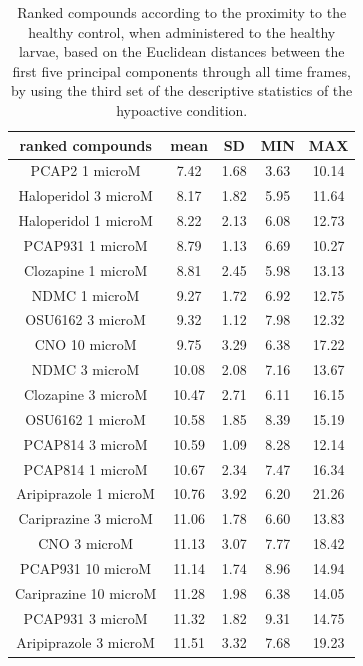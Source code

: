 \begin{table}[h!]\tiny
\centering
\caption{Ranked compounds according to the proximity to the healthy control, when administered to the healthy larvae, based on the Euclidean distances between the first five principal components through all time frames, by using the third set of the descriptive statistics of the hypoactive condition.}
\begin{tabular}{|c|c|c|c|c|}
\hline
ranked compounds             & mean & SD   & MIN  & MAX   \\ \hline
PCAP2 1 microM         & 7.42  & 1.68 & 3.63  & 10.14 \\ \hline
Haloperidol 3 microM   & 8.17  & 1.82 & 5.95  & 11.64 \\ \hline
Haloperidol 1 microM   & 8.22  & 2.13 & 6.08  & 12.73 \\ \hline
PCAP931 1 microM       & 8.79  & 1.13 & 6.69  & 10.27 \\ \hline
Clozapine 1 microM     & 8.81  & 2.45 & 5.98  & 13.13 \\ \hline
NDMC 1 microM          & 9.27  & 1.72 & 6.92  & 12.75 \\ \hline
OSU6162 3 microM       & 9.32  & 1.12 & 7.98  & 12.32 \\ \hline
CNO 10 microM          & 9.75  & 3.29 & 6.38  & 17.22 \\ \hline
NDMC 3 microM          & 10.08 & 2.08 & 7.16  & 13.67 \\ \hline
Clozapine 3 microM     & 10.47 & 2.71 & 6.11  & 16.15 \\ \hline
OSU6162 1 microM       & 10.58 & 1.85 & 8.39  & 15.19 \\ \hline
PCAP814 3 microM       & 10.59 & 1.09 & 8.28  & 12.14 \\ \hline
PCAP814 1 microM       & 10.67 & 2.34 & 7.47  & 16.34 \\ \hline
Aripiprazole 1 microM  & 10.76 & 3.92 & 6.20   & 21.26 \\ \hline
Cariprazine 3 microM   & 11.06 & 1.78 & 6.60   & 13.83 \\ \hline
CNO 3 microM           & 11.13 & 3.07 & 7.77  & 18.42 \\ \hline
PCAP931 10 microM      & 11.14 & 1.74 & 8.96  & 14.94 \\ \hline
Cariprazine 10 microM  & 11.28 & 1.98 & 6.38  & 14.05 \\ \hline
PCAP931 3 microM       & 11.32 & 1.82 & 9.31  & 14.75 \\ \hline
Aripiprazole 3 microM  & 11.51 & 3.32 & 7.68  & 19.23 \\ \hline

\end{tabular}
\end{table}
